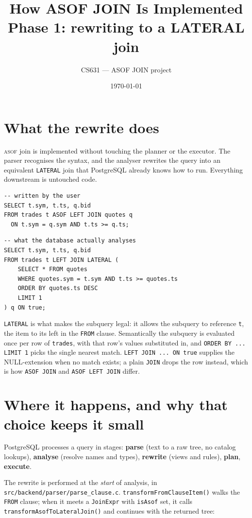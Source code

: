 \documentclass[11pt,a4paper]{article}
\title{\vspace{-2cm}\textbf{How ASOF JOIN Is Implemented}\\[0.2cm]
       \large Phase 1: rewriting to a LATERAL join}
\author{CS631 — ASOF JOIN project}
\date{\today}
\newcommand{\code}[1]{\texttt{\small #1}}
\newcommand{\file}[1]{\texttt{\footnotesize #1}}
\newcommand{\asof}{{\normalfont\scshape asof}}
\begin{document}
\maketitle
\vspace{-0.8cm}

\section{What the rewrite does}

\asof{} join is implemented without touching the planner or the executor. The parser
recognises the syntax, and the analyser rewrites the query into an equivalent
\code{LATERAL} join that PostgreSQL already knows how to run. Everything downstream is
untouched code.

\begin{lstlisting}
-- written by the user
SELECT t.sym, t.ts, q.bid
FROM trades t ASOF LEFT JOIN quotes q
  ON t.sym = q.sym AND t.ts >= q.ts;
\end{lstlisting}

\begin{lstlisting}
-- what the database actually analyses
SELECT t.sym, t.ts, q.bid
FROM trades t LEFT JOIN LATERAL (
    SELECT * FROM quotes
    WHERE quotes.sym = t.sym AND t.ts >= quotes.ts
    ORDER BY quotes.ts DESC
    LIMIT 1
) q ON true;
\end{lstlisting}

\code{LATERAL} is what makes the subquery legal: it allows the subquery to reference
\code{t}, the item to its left in the \code{FROM} clause. Semantically the subquery is
evaluated once per row of \code{trades}, with that row's values substituted in, and
\code{ORDER BY ... LIMIT 1} picks the single nearest match. \code{LEFT JOIN ... ON true}
supplies the NULL-extension when no match exists; a plain \code{JOIN} drops the row
instead, which is how \code{ASOF JOIN} and \code{ASOF LEFT JOIN} differ.

\section{Where it happens, and why that choice keeps it small}

PostgreSQL processes a query in stages: \textbf{parse} (text to a raw tree, no catalog
lookups), \textbf{analyse} (resolve names and types), \textbf{rewrite} (views and rules),
\textbf{plan}, \textbf{execute}.

The rewrite is performed at the \emph{start} of analysis, in
\file{src/backend/parser/parse\_clause.c}. \code{transformFromClauseItem()} walks the
\code{FROM} clause; when it meets a \code{JoinExpr} with \code{isAsof} set, it calls
\code{transformAsofToLateralJoin()} and continues with the returned tree:
\end{document}
